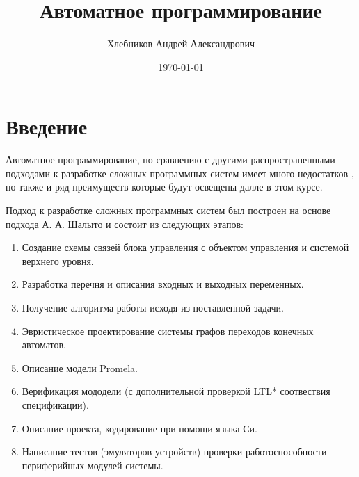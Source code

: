 \documentclass[12pt, twoside]{report}
\begin{document}
\pagestyle{empty}
\title{\textbf{Автоматное программирование}}
\author{Хлебников Андрей Александрович}
\date{\today}

\maketitle
\pagestyle{empty}
\newpage
\renewcommand{\cftchapdotsep}{\cftdotsep}
\tableofcontents
\newpage
\pagestyle{fancy}
\fancyhf{}
\lhead[]{\thepage}
\rhead[\thepage]{}

\singlespacing

\chapter*{Введение}

Автоматное программирование, по сравнению с другими распространенными подходами к 
разработке сложных программных систем имеет много недостатков , 
но также и ряд преимуществ которые будут освещены далле в этом курсе.

Подход к разработке сложных программных систем был построен на основе подхода А. А. Шалыто\cite{Shalito:AutomataProgramming} и 
состоит из следующих этапов:
\begin{enumerate}
  \item Создание схемы связей блока управления с объектом управления и системой верхнего уровня.
  \item Разработка перечня и описания входных и выходных переменных.
  \item Получение алгоритма работы исходя из поставленной задачи.
  \item Эвристическое проектирование системы графов переходов конечных автоматов.
  \item Описание модели Promela.
  \item Верификация мододели (с дополнительной проверкой LTL* соотвествия спецификации).
  \item Описание проекта, кодирование при помощи языка Си.
  \item Написание тестов (эмуляторов устройств) проверки работоспособности периферийных модулей системы.
\end{enumerate}
\end{document}

